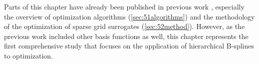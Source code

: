 Parts of this chapter have already been published in previous work
\cite{Valentin14Hierarchische}, especially
the overview of optimization algorithms (\cref{sec:51algorithms})
and the methodology of the optimization of sparse grid surrogates
(\cref{sec:52method}).
However, as the previous work included other basis functions as well,
this chapter represents the first comprehensive study
that focuses on the application of hierarchical B-splines to optimization.







\cleardoublepage
